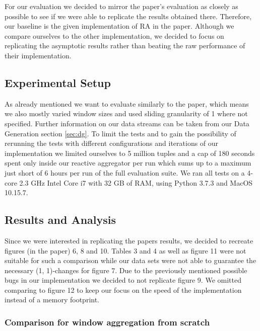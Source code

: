 For our evaluation we decided to mirror the paper's evaluation as closely as possible
to see if we were able to replicate the results obtained there.
Therefore, our baseline is the given implementation of RA in the paper.
Although we compare ourselves to the other implementation, we decided to focus on
replicating the asymptotic results rather than beating the raw performance of their implementation.

\subsection{Experimental Setup}
As already mentioned we want to evaluate similarly to the paper, which means we also mostly varied
window sizes and used sliding granularity of 1 where not specified.
Further information on our data streams can be taken from our Data Generation section \ref{sec:dg}.
To limit the tests and to gain the possibility of rerunning the tests with different configurations
and iterations of our implementation we limited ourselves to 5 million tuples and
a cap of 180 seconds spent only inside our reactive aggregator per run
which sums up to a maximum just short of 6 hours per run of the full evaluation suite.
We ran all tests on a 4-core 2.3 GHz Intel Core i7 with 32 GB of RAM, using
Python 3.7.3 and MacOS 10.15.7.

\subsection{Results and Analysis}
Since we were interested in replicating the papers results, we decided to
recreate figures (in the paper) 6, 8 and 10. Tables 3 and 4 as well as figure 11 were not suitable
for such a comparison while our data sets were not able to guarantee the necessary
(1, 1)-changes for figure 7. Due to the previously mentioned possible bugs in our
implementation we decided to not replicate figure 9. We omitted comparing to figure 12
to keep our focus on the speed of the implementation instead of a memory footprint.

\subsubsection{Comparison for window aggregation from scratch}



